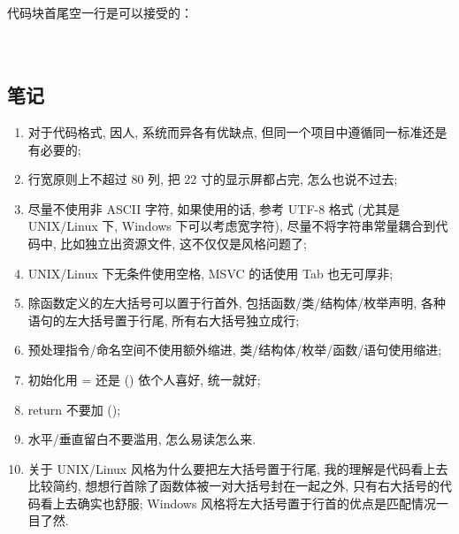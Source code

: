 \documentclass[a4paper,11pt,CJK]{article}
\begin{document}
\begin{CJK}{UTF8}{gbsn}
代码块首尾空一行是可以接受的：\\
\\
\\

\subsection{笔记}
\begin{enumerate}
    \item 对于代码格式, 因人, 系统而异各有优缺点, 但同一个项目中遵循同一标准还是有必要的;

    \item 行宽原则上不超过 80 列, 把 22 寸的显示屏都占完, 怎么也说不过去;

    \item 尽量不使用非 ASCII 字符, 如果使用的话, 参考 UTF-8 格式 (尤其是 UNIX/Linux 下, Windows 下可以考虑宽字符), 尽量不将字符串常量耦合到代码中, 比如独立出资源文件, 这不仅仅是风格问题了;

    \item UNIX/Linux 下无条件使用空格, MSVC 的话使用 Tab 也无可厚非;

    \item 除函数定义的左大括号可以置于行首外, 包括函数/类/结构体/枚举声明, 各种语句的左大括号置于行尾, 所有右大括号独立成行;

    \item 预处理指令/命名空间不使用额外缩进, 类/结构体/枚举/函数/语句使用缩进;
    \item 初始化用 = 还是 () 依个人喜好, 统一就好;
    \item return 不要加 ();
    \item 水平/垂直留白不要滥用, 怎么易读怎么来.
    \item 关于 UNIX/Linux 风格为什么要把左大括号置于行尾, 我的理解是代码看上去比较简约, 想想行首除了函数体被一对大括号封在一起之外, 只有右大括号的代码看上去确实也舒服; Windows 风格将左大括号置于行首的优点是匹配情况一目了然.


\end{enumerate}
\end{CJK}
\end{document}
